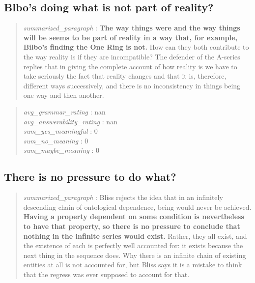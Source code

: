 \hypertarget{blbos-doing-what-is-not-part-of-reality}{%
\subsection{Blbo's doing what is not part of
reality?}\label{blbos-doing-what-is-not-part-of-reality}}

\begin{quote}
\emph{summarized\_paragraph} : \textbf{The way things were and the way
things will be seems to be part of reality in a way that, for example,
Bilbo's finding the One Ring is not.} How can they both contribute to
the way reality is if they are incompatible? The defender of the
A-series replies that in giving the complete account of how reality is
we have to take seriously the fact that reality changes and that it is,
therefore, different ways successively, and there is no inconsistency in
things being one way and then another.
\end{quote}

\begin{quote}
\emph{avg\_grammar\_rating} : nan\\
\emph{avg\_answerability\_rating} : nan\\
\emph{sum\_yes\_meaningful} : 0\\
\emph{sum\_no\_meaning} : 0\\
\emph{sum\_maybe\_meaning} : 0
\end{quote}

\hypertarget{there-is-no-pressure-to-do-what}{%
\subsection{There is no pressure to do
what?}\label{there-is-no-pressure-to-do-what}}

\begin{quote}
\emph{summarized\_paragraph} : Bliss rejects the idea that in an
infinitely descending chain of ontological dependence, being would never
be achieved. \textbf{Having a property dependent on some condition is
nevertheless to have that property, so there is no pressure to conclude
that nothing in the infinite series would exist.} Rather, they all
exist, and the existence of each is perfectly well accounted for: it
exists because the next thing in the sequence does. Why there is an
infinite chain of existing entities at all is not accounted for, but
Bliss says it is a mistake to think that the regress was ever supposed
to account for that.
\end{quote}


